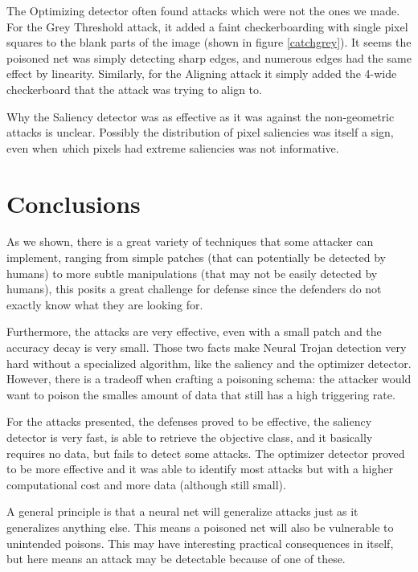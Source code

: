 \documentclass[letterpaper, 10 pt, conference]{ieeeconf}  %
\begin{document}
The Optimizing detector often found attacks which were not the ones we
made.  For the Grey Threshold attack, it added a faint checkerboarding
with single pixel squares to the blank parts of the image (shown in
figure \ref{catchgrey}).  It seems
the poisoned net was simply detecting sharp edges, and numerous edges
had the same effect by linearity.  Similarly, for the Aligning attack
it simply added the 4-wide checkerboard that the attack was trying to
align to.

Why the Saliency detector was as effective as it was against the
non-geometric attacks is unclear.  Possibly the distribution of pixel
saliencies was itself a sign, even when {\textit which} pixels had
extreme saliencies was not informative.

\section{Conclusions}

As we shown, there is a great variety of techniques that some attacker can
implement, ranging from simple patches (that can potentially be detected by
humans) to more subtle manipulations (that may not be easily detected
by humans), this posits a great challenge for defense since the defenders do
not exactly know what they are looking for.

Furthermore, the attacks are very effective, even with a small patch and the
accuracy decay is very small. Those two facts make Neural Trojan detection
very hard without a specialized algorithm, like the saliency and the
optimizer detector. However, there is a tradeoff when crafting a poisoning
schema: the attacker would want to poison the smalles amount of data that still
has a high triggering rate.


For the attacks presented, the defenses proved to be effective, the saliency
detector is very fast, is able to retrieve the objective class, and it basically
requires no data, but fails to detect some attacks. The optimizer detector proved
to be more effective and it was able to identify most attacks but with a
higher computational cost and more data (although still small).

A general principle is that a neural net will generalize attacks just
as it generalizes anything else.  This means a poisoned net will also
be vulnerable to unintended poisons.  This may have interesting
practical consequences in itself, but here means an attack may be
detectable because of one of these.
\end{document}
